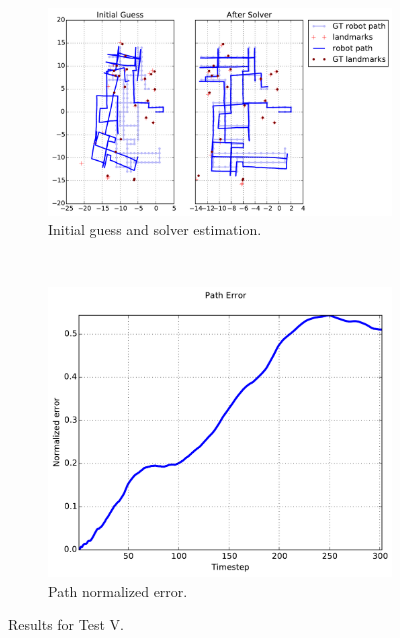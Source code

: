 \begin{figure}[htbp!]
    \centering
    \begin{subfigure}[b]{\estWidth\textwidth}
        \includegraphics[width=\textwidth]{imagenes/tests/known/res_it_1_nl_40_op_1000_oa_1000_lp_1000_ds_300_kw_1.pdf}
        \caption{Initial guess and solver estimation.}
        \label{fig:test-va}
    \end{subfigure}\\
    \begin{subfigure}[b]{\errorWidth\textwidth}
        \includegraphics[width=\textwidth]{imagenes/tests/known/res_it_1_nl_40_op_1000_oa_1000_lp_1000_ds_300_kw_1_path.pdf}
        \caption{Path normalized error.}
        \label{fig:test-vb}
    \end{subfigure}
    \caption{Results for Test V.}
    \label{fig:test-v}
\end{figure}
\clearpage

